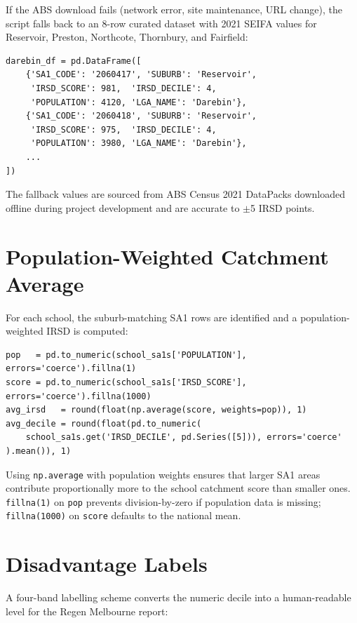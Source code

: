 \documentclass[11pt,a4paper,openany]{book}
\begin{document}
If the ABS download fails (network error, site maintenance, URL change), the script
falls back to an 8-row curated dataset with 2021 SEIFA values for Reservoir, Preston,
Northcote, Thornbury, and Fairfield:

\begin{lstlisting}[style=python, caption={Curated fallback snippet (Reservoir rows).}]
darebin_df = pd.DataFrame([
    {'SA1_CODE': '2060417', 'SUBURB': 'Reservoir',
     'IRSD_SCORE': 981,  'IRSD_DECILE': 4,
     'POPULATION': 4120, 'LGA_NAME': 'Darebin'},
    {'SA1_CODE': '2060418', 'SUBURB': 'Reservoir',
     'IRSD_SCORE': 975,  'IRSD_DECILE': 4,
     'POPULATION': 3980, 'LGA_NAME': 'Darebin'},
    ...
])
\end{lstlisting}

The fallback values are sourced from ABS Census 2021 DataPacks downloaded offline during
project development and are accurate to $\pm$5 IRSD points.

\section{Population-Weighted Catchment Average}

For each school, the suburb-matching SA1 rows are identified and a
population-weighted IRSD is computed:

\begin{lstlisting}[style=python, caption={Population-weighted IRSD for each school catchment.}]
pop   = pd.to_numeric(school_sa1s['POPULATION'],  errors='coerce').fillna(1)
score = pd.to_numeric(school_sa1s['IRSD_SCORE'],  errors='coerce').fillna(1000)
avg_irsd   = round(float(np.average(score, weights=pop)), 1)
avg_decile = round(float(pd.to_numeric(
    school_sa1s.get('IRSD_DECILE', pd.Series([5])), errors='coerce'
).mean()), 1)
\end{lstlisting}

Using \texttt{np.average} with population weights ensures that larger SA1 areas
contribute proportionally more to the school catchment score than smaller ones.
\texttt{fillna(1)} on \texttt{pop} prevents division-by-zero if population data is
missing; \texttt{fillna(1000)} on \texttt{score} defaults to the national mean.

\section{Disadvantage Labels}

A four-band labelling scheme converts the numeric decile into a human-readable level
for the Regen Melbourne report:
\end{document}
